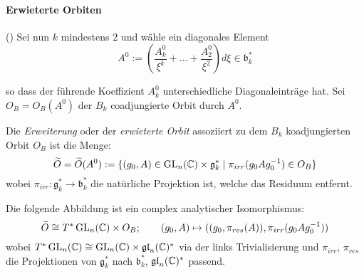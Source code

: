 \paragraph{Erwieterte Orbiten} (\cite[pp.26-36]{thboalch})
Sei nun $k$ mindestens $2$ und wähle ein diagonales Element
\[
A^0:=\left(\frac{A_{k}^0}{\xi^{k}}+\dots+\frac{A_{2}^0}{\xi^2}\right)d\xi
\in \mathfrak b_k^*
\]
\begin{comment}
Ein diagonales Element ist ein Element, dessen Vorfaktoren alle diagonale
Matritzen sind?
\end{comment}
so dass der führende Koeffizient $A_k^0$ unterschiedliche Diagonaleinträge hat.
Sei $O_B=O_B(A^0)$ der $B_k$ coadjungierte Orbit durch $A^0$.
\begin{defn}
Die \emph{Erweiterung} oder der \emph{erwieterte Orbit} assoziiert zu dem $B_k$
koadjungierten Orbit $O_B$ ist die Menge:
\[
\widetilde O = \widetilde O(A^0) :=\{ (g_0,A)\in\operatorname{GL}_n(\mathbb{C})\times\mathfrak g_k^*
  \mid \pi_{irr}(g_0Ag_0^{-1})\in O_B \}
\]
wobei $\pi_{irr}:\mathfrak g_k^*\to\mathfrak b_k^*$ die natürliche Projektion
ist, welche das Residuum entfernt.
\end{defn}
\begin{comment}
Warum denn \textbf{"erwieterte"} (extended) Orbiten, Fragen:
\begin{itemize}
\item ist für jedes Element von $\tilde O$ auch dessen $G_k$ Orbit komplett in
$\tilde O$ enthalten? Dazu:\\
Sei $A\in \tilde O$, sei $g\in G_k$ dann ist $gAg^{-1}\in O(A)$.
Es ist auch $gAg^{-1}$ in $\tilde O$, denn...
\end{itemize}
\end{comment}
\begin{lem}  
Die folgende Abbildung ist ein complex analytischer Isomorphismus:
\[
\widetilde O\cong T^*\operatorname{GL}_n(\mathbb{C})\times O_B;\qquad 
  (g_0,A)\mapsto ((g_0,\pi_{res}(A)),\pi_{irr}(g_0Ag_0^{-1}))
\]
wobei $T^*\operatorname{GL}_n(\mathbb{C})\cong \operatorname{GL}_n(\mathbb{C})\times\mathfrak{gl}_n(\mathbb{C})^*$ via der links
Trivialisierung und $\pi_{irr}$, $\pi_{res}$ die Projektionen von $\mathfrak
g_k^*$ nach $\mathfrak b_k^*$, $\mathfrak{gl}_n(\mathbb{C})^*$ passend.
\end{lem}
